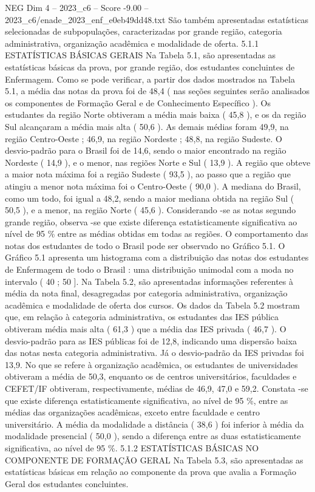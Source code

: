 \begin{textsample}{NEG Dim 4 – 2023\_c6 – Score -9.00 – 2023\_c6/enade\_2023\_enf\_e0eb49dd48.txt}
São também apresentadas estatísticas selecionadas de subpopulações, caracterizadas por grande região, categoria administrativa, organização acadêmica e modalidade de oferta. 5.1.1 ESTATÍSTICAS BÁSICAS GERAIS Na Tabela 5.1, são apresentadas as estatísticas básicas da prova, por grande região, dos estudantes concluintes de Enfermagem.
Como se pode verificar, a partir dos dados mostrados na Tabela 5.1, a média das notas da prova foi de 48,4 ( nas seções seguintes serão analisados os componentes de Formação Geral e de Conhecimento Específico ).
Os estudantes da região Norte obtiveram a média mais baixa ( 45,8 ), e os da região Sul alcançaram a média mais alta ( 50,6 ).
As demais médias foram 49,9, na região Centro-Oeste ; 46,9, na região Nordeste ; 48,8, na região Sudeste.
O desvio-padrão para o Brasil foi de 14,6, sendo o maior encontrado na região Nordeste ( 14,9 ), e o menor, nas regiões Norte e Sul ( 13,9 ).
A região que obteve a maior nota máxima foi a região Sudeste ( 93,5 ), ao passo que a região que atingiu a menor nota máxima foi o Centro-Oeste ( 90,0 ).
A mediana do Brasil, como um todo, foi igual a 48,2, sendo a maior mediana obtida na região Sul ( 50,5 ), e a menor, na região Norte ( 45,6 ).
Considerando -se as notas segundo grande região, observa -se que existe diferença estatisticamente significativa ao nível de 95 \% entre as médias obtidas em todas as regiões.
O comportamento das notas dos estudantes de todo o Brasil pode ser observado no Gráfico 5.1.
O Gráfico 5.1 apresenta um histograma com a distribuição das notas dos estudantes de Enfermagem de todo o Brasil : uma distribuição unimodal com a moda no intervalo ( 40 ; 50 ].
Na Tabela 5.2, são apresentadas informações referentes à média da nota final, desagregadas por categoria administrativa, organização acadêmica e modalidade de oferta dos cursos.
Os dados da Tabela 5.2 mostram que, em relação à categoria administrativa, os estudantes das IES pública obtiveram média mais alta ( 61,3 ) que a média das IES privada ( 46,7 ).
O desvio-padrão para as IES públicas foi de 12,8, indicando uma dispersão baixa das notas nesta categoria administrativa.
Já o desvio-padrão da IES privadas foi 13,9.
No que se refere à organização acadêmica, os estudantes de universidades obtiveram a média de 50,3, enquanto os de centros universitários, faculdades e CEFET/IF obtiveram, respectivamente, médias de 46,9, 47,0 e 59,2.
Constata -se que existe diferença estatisticamente significativa, ao nível de 95 \%, entre as médias das organizações acadêmicas, exceto entre faculdade e centro universitário.
A média da modalidade a distância ( 38,6 ) foi inferior à média da modalidade presencial ( 50,0 ), sendo a diferença entre as duas estatisticamente significativa, ao nível de 95 \%. 5.1.2 ESTATÍSTICAS BÁSICAS NO COMPONENTE DE FORMAÇÃO GERAL Na Tabela 5.3, são apresentadas as estatísticas básicas em relação ao componente da prova que avalia a Formação Geral dos estudantes concluintes.

\end{textsample}
